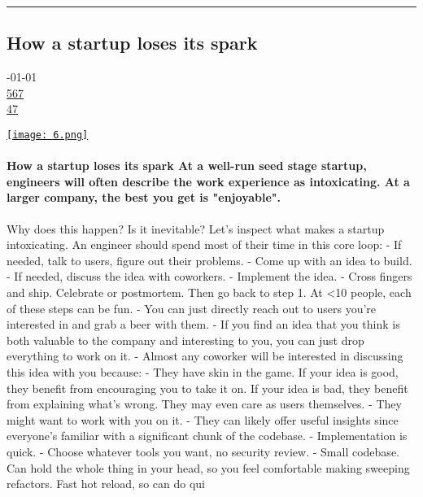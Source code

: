\documentclass[10pt,a4paper]{article}
\begin{document}
\par\medskip
\noindent\textcolor{red}{\rule{\linewidth}{0.2mm}}

\subsection{How a startup loses its spark}
\noindent\begin{minipage}[t]{0.20\linewidth}
\vspace{0pt}
\noindent\textsc{\footnotesize
{\scriptsize\faCalendar}-01-01 \\
{\scriptsize\faThumbsOUp}\space 
\href{http://news.ycombinator.com/item?id=37098483\&utm\_term=comment}{567} \\
{\scriptsize\faComments}\space 
\href{http://news.ycombinator.com/item?id=37098483\&utm\_term=comment}{47} \\
}
\end{minipage} %
\begin{minipage}[t]{0.80\linewidth}
\vspace{0pt}
\begin{multicols}{2}

    \href{https://blog.johnqian.com/startup-spark?utm\_source=hackernewsletter\&utm\_medium=email\&utm\_term=fav}{
        \texttt{[image: 6.png]}
    }
  
\paragraph{How a startup loses its spark
At a well-run seed stage startup, engineers will often describe the work experience as intoxicating. At a larger company, the best you get is "enjoyable".}
 Why does this happen? Is it inevitable?
Let's inspect what makes a startup intoxicating. An engineer should spend most of their time in this core loop:
- If needed, talk to users, figure out their problems.
- Come up with an idea to build.
- If needed, discuss the idea with coworkers.
- Implement the idea.
- Cross fingers and ship. Celebrate or postmortem. Then go back to step 1.
At <10 people, each of these steps can be fun.
- You can just directly reach out to users you’re interested in and grab a beer with them.
- If you find an idea that you think is both valuable to the company and interesting to you, you can just drop everything to work on it.
- Almost any coworker will be interested in discussing this idea with you because:
- They have skin in the game. If your idea is good, they benefit from encouraging you to take it on. If your idea is bad, they benefit from explaining what’s wrong. They may even care as users themselves.
- They might want to work with you on it.
- They can likely offer useful insights since everyone’s familiar with a significant chunk of the codebase.
- Implementation is quick.
- Choose whatever tools you want, no security review.
- Small codebase. Can hold the whole thing in your head, so you feel comfortable making sweeping refactors. Fast hot reload, so can do qui

\end{multicols}
\end{minipage}
\end{document}

